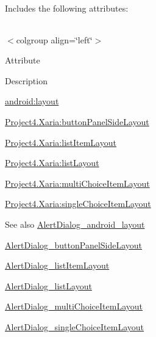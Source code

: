 Includes the following attributes\+:

\tabulinesep=1mm
\begin{longtabu} spread 0pt [c]{*{0}{|X[-1]}|}
\hline
\end{longtabu}
$<$colgroup align=\char`\"{}left\char`\"{}$>$ 

Attribute

Description 

{\ttfamily \hyperlink{classproject4_1_1xaria_1_1R_1_1styleable_a9953878a870cb4fabdb2e6d4052b6592}{android\+:layout}}

{\ttfamily \hyperlink{classproject4_1_1xaria_1_1R_1_1styleable_a1833a885cce0614ceaed95c1792d8bb6}{Project4.\+Xaria\+:button\+Panel\+Side\+Layout}}

{\ttfamily \hyperlink{classproject4_1_1xaria_1_1R_1_1styleable_ab18f2ebca215c3b56455c5bf016daed3}{Project4.\+Xaria\+:list\+Item\+Layout}}

{\ttfamily \hyperlink{classproject4_1_1xaria_1_1R_1_1styleable_a263c5c915bd8c850ce36810a7867291f}{Project4.\+Xaria\+:list\+Layout}}

{\ttfamily \hyperlink{classproject4_1_1xaria_1_1R_1_1styleable_a8c3f104371ce0fd47e43a3202a641816}{Project4.\+Xaria\+:multi\+Choice\+Item\+Layout}}

{\ttfamily \hyperlink{classproject4_1_1xaria_1_1R_1_1styleable_a9b45eea7b3a28fece617988bdf526ee4}{Project4.\+Xaria\+:single\+Choice\+Item\+Layout}}

\begin{DoxySeeAlso}{See also}
\hyperlink{classproject4_1_1xaria_1_1R_1_1styleable_a9953878a870cb4fabdb2e6d4052b6592}{Alert\+Dialog\+\_\+android\+\_\+layout} 

\hyperlink{classproject4_1_1xaria_1_1R_1_1styleable_a1833a885cce0614ceaed95c1792d8bb6}{Alert\+Dialog\+\_\+button\+Panel\+Side\+Layout} 

\hyperlink{classproject4_1_1xaria_1_1R_1_1styleable_ab18f2ebca215c3b56455c5bf016daed3}{Alert\+Dialog\+\_\+list\+Item\+Layout} 

\hyperlink{classproject4_1_1xaria_1_1R_1_1styleable_a263c5c915bd8c850ce36810a7867291f}{Alert\+Dialog\+\_\+list\+Layout} 

\hyperlink{classproject4_1_1xaria_1_1R_1_1styleable_a8c3f104371ce0fd47e43a3202a641816}{Alert\+Dialog\+\_\+multi\+Choice\+Item\+Layout} 

\hyperlink{classproject4_1_1xaria_1_1R_1_1styleable_a9b45eea7b3a28fece617988bdf526ee4}{Alert\+Dialog\+\_\+single\+Choice\+Item\+Layout} 
\end{DoxySeeAlso}
\mbox{\label{classproject4_1_1xaria_1_1R_1_1styleable_a9953878a870cb4fabdb2e6d4052b6592}} 
